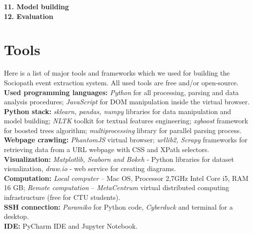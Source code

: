 \textbf{11. Model building}\\

\textbf{12. Evaluation}\\

\section{Tools}

Here is a list of major tools and frameworks which we used for building the Sociopath event extraction system. All used tools are free and/or open-source.\\

\noindent\textbf{Used programming languages:} \textit{Python} for all processing, parsing and data analysis procedures; \textit{JavaScript} for DOM manipulation inside the virtual browser.\\

\noindent\textbf{Python stack:} \textit{sklearn, pandas, numpy} libraries for data manipulation and model building; \textit{NLTK} toolkit for textual features engineering;  \textit{xgboost} framework for boosted trees algorithm; \textit{multiprocessing} library for parallel parsing process. \\

\noindent\textbf{Webpage crawling:} \textit{PhantomJS} virtual browser; \textit{urllib2, Scrapy} frameworks for retrieving data from a URL webpage with CSS and XPath selectors.\\

\noindent\textbf{Visualization:} \textit{Matplotlib, Seaborn and Bokeh} - Python libraries for dataset visualization, \textit{draw.io} - web service for creating diagrams. \\

\noindent\textbf{Computation:} \textit{Local computer} -- Mac OS, Processor 2,7GHz Intel Core i5, RAM 16 GB; \textit{Remote computation} -- \textit{MetaCentrum} virtual distributed computing infrastructure (free for CTU students).\\

\noindent\textbf{SSH connection:} \textit{Paramiko} for Python code, \textit{Cyberduck} and terminal for a desktop.\\

\noindent\textbf{IDE:} PyCharm IDE and Jupyter Notebook.\\





